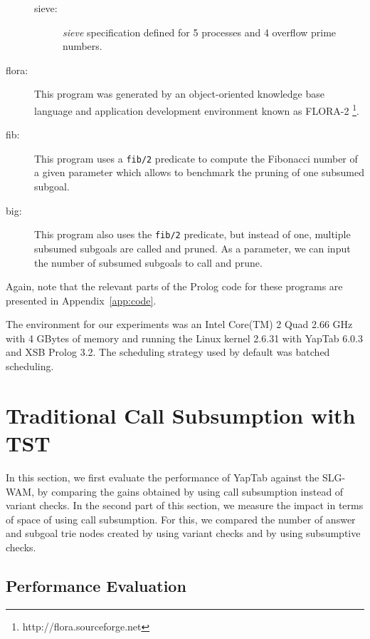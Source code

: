 \begin{description}
\begin{description}
         \item[sieve:] \emph{sieve} specification defined for 5 processes and 4 overflow prime numbers.

      \end{description}
      
   \item[flora:] This program was generated by an object-oriented knowledge base language and application 
               development environment known as FLORA-2 \cite{Yang-00}\footnote{http://flora.sourceforge.net}.
               
   \item[fib:] This program uses a \texttt{fib/2} predicate to compute the Fibonacci number of a given
   parameter which allows to benchmark the pruning of one subsumed subgoal.
   
   \item[big:] This program also uses the \texttt{fib/2} predicate, but instead of one, multiple subsumed subgoals
   are called and pruned. As a parameter, we can input the number of subsumed subgoals to call and prune.
   
\end{description}

Again, note that the relevant parts of the Prolog code for these programs are presented in Appendix~\ref{app:code}.

The environment for our experiments was an Intel Core(TM) 2 Quad 2.66 GHz with 4 GBytes of
memory and running the Linux kernel 2.6.31 with YapTab 6.0.3 and XSB Prolog 3.2.
The scheduling strategy used by default was batched scheduling.

\section{Traditional Call Subsumption with TST}

In this section, we first evaluate the performance of YapTab against the SLG-WAM,
by comparing the gains obtained by using call subsumption instead of variant checks.
In the second part of this section, we measure the impact in terms of space of using
call subsumption. For this, we compared the number of answer and subgoal trie nodes
created by using variant checks and by using subsumptive checks.

\subsection{Performance Evaluation}


